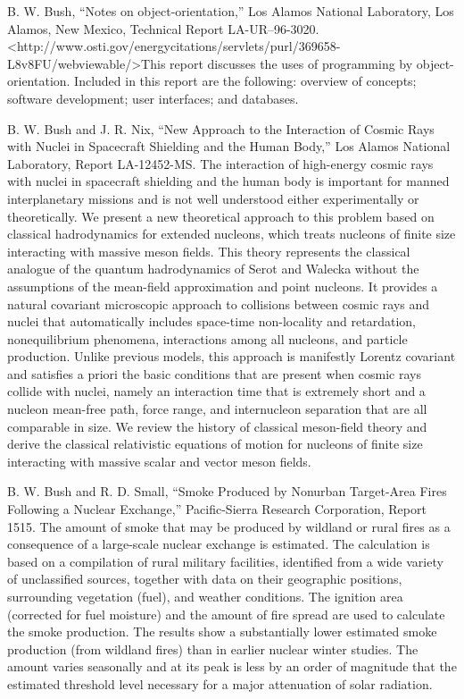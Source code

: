 \documentclass[]{article}
\begin{document}
B. W. Bush, ``Notes on object-orientation,'' Los Alamos National
Laboratory, Los Alamos, New Mexico, Technical Report LA-UR--96-3020.
\textless{}http://www.osti.gov/energycitations/servlets/purl/369658-L8v8FU/webviewable/\textgreater{}This
report discusses the uses of programming by object-orientation. Included
in this report are the following: overview of concepts; software
development; user interfaces; and databases.

B. W. Bush and J. R. Nix, ``New Approach to the Interaction of Cosmic
Rays with Nuclei in Spacecraft Shielding and the Human Body,'' Los
Alamos National Laboratory, Report LA-12452-MS. The interaction of
high-energy cosmic rays with nuclei in spacecraft shielding and the
human body is important for manned interplanetary missions and is not
well understood either experimentally or theoretically. We present a new
theoretical approach to this problem based on classical hadrodynamics
for extended nucleons, which treats nucleons of finite size interacting
with massive meson fields. This theory represents the classical analogue
of the quantum hadrodynamics of Serot and Walecka without the
assumptions of the mean-field approximation and point nucleons. It
provides a natural covariant microscopic approach to collisions between
cosmic rays and nuclei that automatically includes space-time
non-locality and retardation, nonequilibrium phenomena, interactions
among all nucleons, and particle production. Unlike previous models,
this approach is manifestly Lorentz covariant and satisfies a priori the
basic conditions that are present when cosmic rays collide with nuclei,
namely an interaction time that is extremely short and a nucleon
mean-free path, force range, and internucleon separation that are all
comparable in size. We review the history of classical meson-field
theory and derive the classical relativistic equations of motion for
nucleons of finite size interacting with massive scalar and vector meson
fields.

B. W. Bush and R. D. Small, ``Smoke Produced by Nonurban Target-Area
Fires Following a Nuclear Exchange,'' Pacific-Sierra Research
Corporation, Report 1515. The amount of smoke that may be produced by
wildland or rural fires as a consequence of a large-scale nuclear
exchange is estimated. The calculation is based on a compilation of
rural military facilities, identified from a wide variety of
unclassified sources, together with data on their geographic positions,
surrounding vegetation (fuel), and weather conditions. The ignition area
(corrected for fuel moisture) and the amount of fire spread are used to
calculate the smoke production. The results show a substantially lower
estimated smoke production (from wildland fires) than in earlier nuclear
winter studies. The amount varies seasonally and at its peak is less by
an order of magnitude that the estimated threshold level necessary for a
major attenuation of solar radiation.
\end{document}
